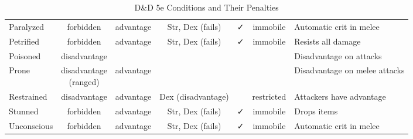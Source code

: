 \documentclass[12pt,letterpaper,landscape]{article}
\begin{document}
\begin{table}[h!]
\begin{tabular}{@{}l c c c c c l@{}}
\rowcolor{white}
Paralyzed          & forbidden      & advantage    & Str, Dex (fails)           & ✓             & immobile              & Automatic crit in melee \\ 
\rowcolor{beige}
Petrified          & forbidden      & advantage    & Str, Dex (fails)           & ✓             & immobile              & Resists all damage \\ 
\rowcolor{white}
Poisoned           & disadvantage   &              &                            &               &                       & Disadvantage on attacks \\ 
\rowcolor{beige}
Prone              & \parbox{2.5cm}{\centering disadvantage \\ (ranged)} 
                                   & advantage    &                            &               &                       & Disadvantage on melee attacks \\ 
Restrained         & disadvantage   & advantage    & Dex (disadvantage)         &               & restricted            & Attackers have advantage \\ 
Stunned            & forbidden      & advantage    & Str, Dex (fails)           & ✓             & immobile              & Drops items \\ 
Unconscious        & forbidden      & advantage    & Str, Dex (fails)           & ✓             & immobile              & Automatic crit in melee \\ \bottomrule
\end{tabular}
\caption{D\&D 5e Conditions and Their Penalties}
\label{tab:conditions}
\end{table}
\end{document}
